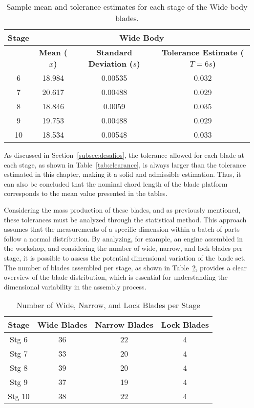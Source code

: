 \begin{table}[H]
    \centering
    \caption{Sample mean and tolerance estimates for each stage of the Wide body blades.}
    \label{tab:mean_tolerance_wide}
    \begin{tabular}{cccc}
        \hline
        \textbf{Stage} & \multicolumn{3}{c|}{\textbf{Wide Body}} \\
        \hline
        & \textbf{Mean (\( \bar{x} \))} & \textbf{Standard Deviation (\( s \))} & \textbf{Tolerance Estimate (\( T = 6s \))} \\
        \hline
        6  & 18.984 & 0.00535 & 0.032 \\
        7  & 20.617 & 0.00488 & 0.029 \\
        8  & 18.846 & 0.0059  & 0.035 \\
        9  & 19.753 & 0.00488  & 0.029 \\
        10 & 18.534 & 0.00548  & 0.033 \\
        \hline
    \end{tabular}
\end{table}


As discussed in Section~\ref{subsec:desafios}, the tolerance allowed for each blade at each stage, as shown in Table~\ref{tab:clearance}, is always larger than the tolerance estimated in this chapter, making it a solid and admissible estimation. Thus, it can also be concluded that the nominal chord length of the blade platform corresponds to the mean value presented in the tables.

Considering the mass production of these blades, and as previously mentioned, these tolerances must be analyzed through the statistical method. This approach assumes that the measurements of a specific dimension within a batch of parts follow a normal distribution. By analyzing, for example, an engine assembled in the workshop, and considering the number of wide, narrow, and lock blades per stage, it is possible to assess the potential dimensional variation of the blade set. The number of blades assembled per stage, as shown in Table~\ref{tab:number_of_blades}, provides a clear overview of the blade distribution, which is essential for understanding the dimensional variability in the assembly process.

\begin{table}[H]
    \centering
    \caption{Number of Wide, Narrow, and Lock Blades per Stage}
    \label{tab:number_of_blades}
    \begin{tabular}{cccc}
        \hline
        \textbf{Stage} & \textbf{Wide Blades} & \textbf{Narrow Blades} & \textbf{Lock Blades} \\
        \hline
        Stg 6 & 36 & 22 & 4 \\
        Stg 7 & 33 & 20 & 4 \\
        Stg 8 & 39 & 20 & 4 \\
        Stg 9 & 37 & 19 & 4 \\
        Stg 10 & 38 & 22 & 4 \\
        \hline
    \end{tabular}
\end{table}

